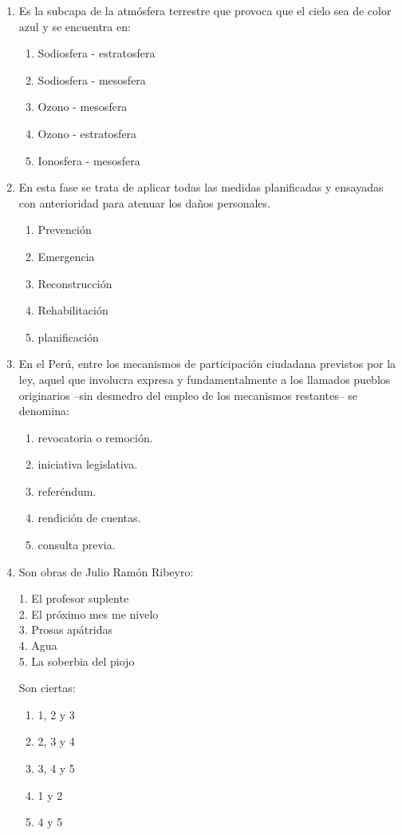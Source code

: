 \begin{enumerate}
	\item Es la subcapa de la atmósfera terrestre que provoca que el cielo sea de color azul y se encuentra en:
	\begin{enumerate}[label=\alph*)]
		\item Sodiosfera - estratosfera
		\item Sodiosfera - mesosfera
		\item Ozono - mesosfera
		\item Ozono - estratosfera
		\item Ionosfera - mesosfera
	\end{enumerate}
	
	\item En esta fase se trata de aplicar todas las medidas planificadas y ensayadas con anterioridad para atenuar los daños personales.
	\begin{enumerate}[label=\alph*)]
		\item Prevención
		\item Emergencia
		\item Reconstrucción
		\item Rehabilitación
		\item planificación
	\end{enumerate}
	
	\item En el Perú, entre los mecanismos de participación ciudadana previstos por la ley, aquel que involucra expresa y fundamentalmente a los llamados pueblos originarios --sin desmedro del empleo de los mecanismos restantes-- se denomina:
	\begin{enumerate}[label=\alph*)]
		\item revocatoria o remoción.
		\item iniciativa legislativa.
		\item referéndum.
		\item rendición de cuentas.
		\item consulta previa.
	\end{enumerate}
	
	\item Son obras de Julio Ramón Ribeyro:
	
	1. El profesor suplente\\
	2. El próximo mes me nivelo\\
	3. Prosas apátridas\\
	4. Agua\\
	5. La soberbia del piojo
	
	Son ciertas:
	\begin{enumerate}[label=\alph*)]
		\item 1, 2 y 3
		\item 2, 3 y 4
		\item 3, 4 y 5
		\item 1 y 2
		\item 4 y 5
	\end{enumerate}
	

\end{enumerate}
